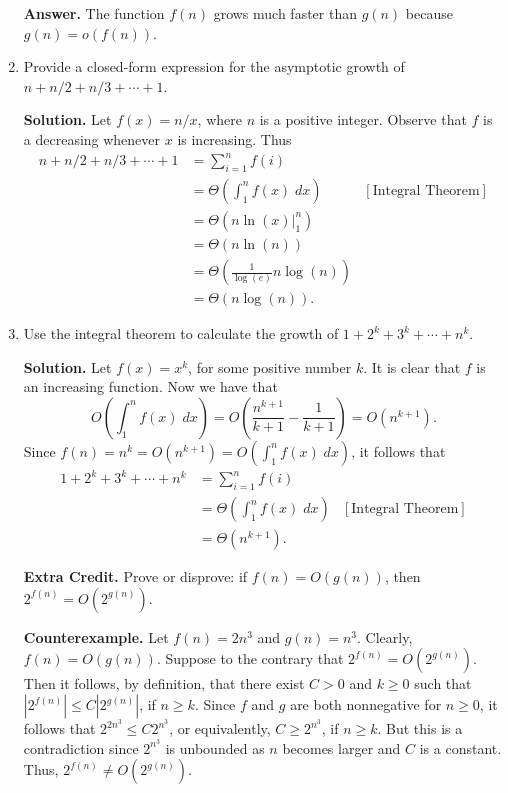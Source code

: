 \documentclass[9pt]{article}
\begin{document}
\begin{enumerate}
      \textbf{Answer.} The function $f(n)$ grows much faster than $g(n)$
      because $g(n) = o(f(n))$.
   \item Provide a closed-form expression for the asymptotic growth of
         $n + n/2 + n/3 + \cdots + 1$.

      \textbf{Solution.} Let $f(x) = n/x$, where $n$ is a positive integer.
      Observe that $f$ is a decreasing whenever $x$ is increasing. Thus
      \begin{align*}
         n + n/2 + n/3 + \cdots + 1 &= \sum_{i=1}^nf(i) \\
            &= \Theta\left(\int_1^n f(x)\;dx\right) &[\text{Integral Theorem}]\\
            &= \Theta\left(n\ln(x)\bigg|_1^n\right) \\
            &= \Theta(n\ln(n)) \\
            &= \Theta\left(\frac{1}{\log(e)}n\log(n)\right) \\
            &= \Theta(n\log(n)).
      \end{align*}
   \item Use the integral theorem to calculate the growth of
         $1 + 2^k + 3^k + \cdots + n^k$.

      \textbf{Solution.} Let $f(x) = x^k$, for some positive number $k$. It is
      clear that $f$ is an increasing function. Now we have that
      $$O\left(\int_1^nf(x)\;dx\right) = O\left(\frac{n^{k+1}}{k+1} -
          \frac{1}{k+1}\right) = O(n^{k+1}).$$
      Since $f(n) = n^k = O(n^{k+1}) = O\left(\int_1^nf(x)\;dx\right)$, it 
      follows that
      \begin{align*}
         1 + 2^k + 3^k + \cdots + n^k &= \sum_{i=1}^nf(i) \\
            &= \Theta\left(\int_1^nf(x)\;dx\right) &[\text{Integral Theorem}]\\
            &= \Theta(n^{k+1}).
      \end{align*}
   \item[\textbf{Extra Credit.}] Prove or disprove: if $f(n) = O(g(n))$, then
                                 $2^{f(n)} = O(2^{g(n)})$.

      \textbf{Counterexample.} Let $f(n) = 2n^3$ and $g(n) = n^3$. Clearly,
      $f(n) = O(g(n))$. Suppose to the contrary that $2^{f(n)} = O(2^{g(n)})$.
      Then it follows, by definition, that there exist $C > 0$ and $k \ge 0$
      such that $|2^{f(n)}| \le C|2^{g(n)}|$, if $n \ge k$. Since $f$ and $g$
      are both nonnegative for $n \ge 0$, it follows that $2^{2n^3}\le C2^{n^3}$,
      or equivalently, $C \ge 2^{n^3}$, if $n \ge k$. But this is a
      contradiction since $2^{n^3}$ is unbounded as $n$ becomes larger and $C$
      is a constant. Thus, $2^{f(n)} \neq O(2^{g(n)})$.
      
\end{enumerate}
\end{document}

